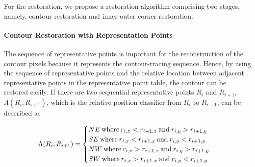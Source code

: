 
For the restoration, we propose a restoration algorithm comprising two stages, namely, contour restoration and inner-outer corner restoration.


\paragraph{Contour Restoration with Representation Points}


The sequence of representative points is important for the reconstruction of the contour pixels because it represents the contour-tracing sequence. Hence, by using the sequence of representative points and the relative location between adjacent representative points in the representative point table, the contour can be restored easily. If there are two sequential representative points $R_i$ and $R_{i+1}$, $\Lambda(R_i, R_{i+1})$, which is the relative position classifier from $R_i$ to $R_{i+1}$, can be described as 

\begin{equation}
	\Lambda(R_i, R_{i+1}) = \begin{cases}
	NE\: \text{where\:} r_{i,x} < r_{i+1,x}\: \text{and\:} r_{i,y} > r_{i+1,y} \\ 
	SE\: \text{where\:} r_{i,x} < r_{i+1,x}\: \text{and\:} r_{i,y} < r_{i+1,y} \\ 
	NW\: \text{where\:} r_{i,x} > r_{i+1,x}\: \text{and\:} r_{i,y} > r_{i+1,y} \\ 
	SW\: \text{where\:} r_{i,x} > r_{i+1,x}\: \text{and\:} r_{i,y} < r_{i+1,y}
	\end{cases}
	\label{eq:lambda}
\end{equation}

